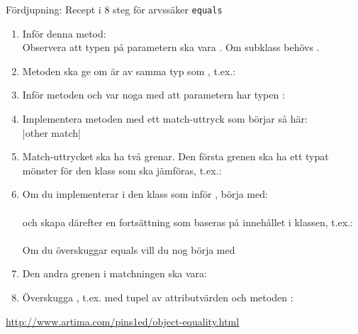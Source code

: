 \begin{Slide}{Fördjupning: Recept i 8 steg för arvssäker \texttt{equals}}\SlideFontTiny
\SlideOnly{\setlength{\leftmargini}{0pt}}
\begin{enumerate}\SlideFontTiny
\item Inför denna metod: \\Observera att typen på parametern ska vara . Om subklass behövs .

\item Metoden  ska ge  om  är av samma typ som , t.ex.: \\

\item Inför metoden  och var noga med att parametern har typen : \\ 

\item Implementera metoden  med ett match-uttryck som börjar så här: \\
\code|other match|

\item Match-uttrycket ska ha två grenar. Den första grenen ska ha ett typat mönster för den klass som ska jämföras, t.ex.: \\ 

\item Om du implementerar  i den klass som inför , börja med: \\  \\
och skapa därefter en fortsättning som baseras på innehållet i klassen, t.ex.: \\  \\
Om du överskuggar equals vill du nog börja med

\item Den andra grenen i matchningen ska vara:

\item Överskugga , t.ex. med tupel av attributvärden och metoden \code{##}: \\

\end{enumerate}
\url{http://www.artima.com/pins1ed/object-equality.html}

\end{Slide}


